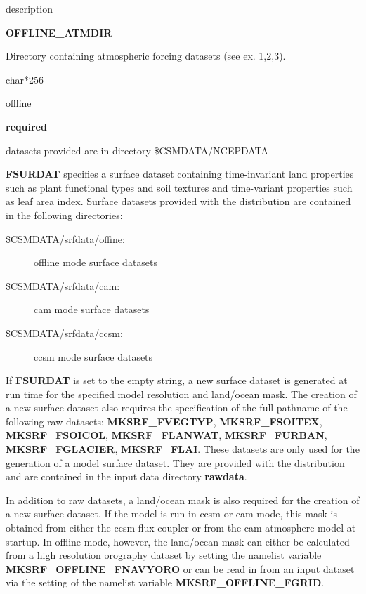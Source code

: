 \begin{Ventry}{description}
 \item[{\bf name}] {\bf OFFLINE\_ATMDIR}  
 \item[description] Directory containing atmospheric forcing datasets (see ex. 1,2,3). 
 \item[type] char*256   
 \item[mode] offline   
 \item[default] {\bf required}  
 \item[notes] datasets provided are in directory \$CSMDATA/NCEPDATA  
\end{Ventry}
\bigskip

{\bf FSURDAT} specifies a surface dataset containing time-invariant
land properties such as plant functional types and soil textures and
time-variant properties such as leaf area index. Surface datasets
provided with the distribution are contained in the following
directories:

\begin{description}
\item [\$CSMDATA/srfdata/offine: ] offline mode surface datasets
\item [\$CSMDATA/srfdata/cam: ]  cam mode surface datasets
\item [\$CSMDATA/srfdata/ccsm: ]  ccsm mode surface datasets
\end{description}

If {\bf FSURDAT} is set to the empty string, a new surface dataset is
generated at run time for the specified model resolution and
land/ocean mask. The creation of a new surface dataset also requires
the specification of the full pathname of the following raw datasets:
{\bf MKSRF\_FVEGTYP}, {\bf MKSRF\_FSOITEX}, {\bf MKSRF\_FSOICOL}, {\bf
MKSRF\_FLANWAT}, {\bf MKSRF\_FURBAN}, {\bf MKSRF\_FGLACIER}, {\bf
MKSRF\_FLAI}.  These datasets are only used for the generation of a
model surface dataset. They are provided with the distribution and are
contained in the input data directory {\bf rawdata}.

In addition to raw datasets, a land/ocean mask is also required for
the creation of a new surface dataset. If the model is run in ccsm or
cam mode, this mask is obtained from either the ccsm flux coupler or
from the cam atmosphere model at startup.  In offline mode, however,
the land/ocean mask can either be calculated from a high resolution
orography dataset by setting the namelist variable {\bf
MKSRF\_OFFLINE\_FNAVYORO} or can be read in from an input dataset via
the setting of the namelist variable {\bf MKSRF\_OFFLINE\_FGRID}.


